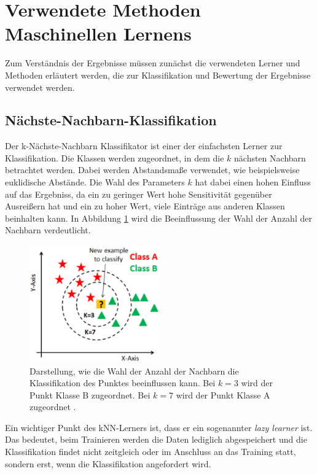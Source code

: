\section{Verwendete Methoden Maschinellen Lernens}
\label{sec:lerner}
Zum Verständnis der Ergebnisse müssen zunächst die verwendeten 
Lerner und Methoden erläutert werden, die zur Klassifikation 
und Bewertung der Ergebnisse verwendet werden.

\subsection{Nächste-Nachbarn-Klassifikation}

Der k-Nächste-Nachbarn Klassifikator ist einer der einfachsten Lerner zur 
Klassifikation. Die Klassen werden zugeordnet, in dem die $k$ nächsten Nachbarn 
betrachtet werden. Dabei werden Abstandsmaße verwendet, wie beispielsweise 
euklidische Abstände. Die Wahl des Parameters $k$ hat dabei einen hohen Einfluss 
auf das Ergebniss, da ein zu geringer Wert hohe Sensitivität gegenüber Ausreißern 
hat und ein zu hoher Wert, viele Einträge aus anderen Klassen beinhalten kann. 
In Abbildung \ref{fig:knn} wird die Beeinflussung der Wahl der Anzahl der Nachbarn 
verdeutlicht.

\begin{figure}
  \centering
  \includegraphics[width=0.5\textwidth]{plots/knn.pdf}
  \caption{Darstellung, wie die Wahl der Anzahl der Nachbarn die Klassifikation des Punktes 
  beeinflussen kann. Bei $k = 3$ wird der Punkt Klasse B zugeordnet. Bei 
  $k = 7$ wird der Punkt Klasse A zugeordnet \cite{kNN}.}
  \label{fig:knn}
\end{figure}

Ein
wichtiger Punkt des kNN-Lerners ist, dass er ein sogenannter \textit{lazy learner} 
ist. Das bedeutet, beim Trainieren werden die Daten lediglich abgespeichert und 
die Klassifikation findet nicht zeitgleich oder im Anschluss an das Training 
statt, sondern erst, wenn die Klassifikation angefordert wird. 


